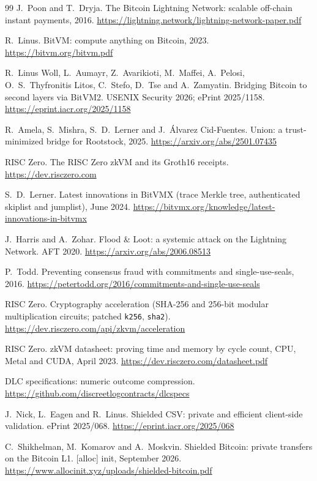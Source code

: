 \documentclass[11pt]{article}
\begin{document}
\begin{thebibliography}{99}
 J.~Poon and T.~Dryja. The Bitcoin Lightning Network: scalable off-chain instant payments, 2016. \url{https://lightning.network/lightning-network-paper.pdf}

 R.~Linus. BitVM: compute anything on Bitcoin, 2023. \url{https://bitvm.org/bitvm.pdf}

 R.~Linus Woll, L.~Aumayr, Z.~Avarikioti, M.~Maffei, A.~Pelosi, O.~S.~Thyfronitis Litos, C.~Stefo, D.~Tse and A.~Zamyatin. Bridging Bitcoin to second layers via BitVM2. USENIX Security 2026; ePrint 2025/1158. \url{https://eprint.iacr.org/2025/1158}

 R.~Amela, S.~Mishra, S.~D.~Lerner and J.~\'Alvarez Cid-Fuentes. Union: a trust-minimized bridge for Rootstock, 2025. \url{https://arxiv.org/abs/2501.07435}

 RISC Zero. The RISC Zero zkVM and its Groth16 receipts. \url{https://dev.risczero.com}

 S.~D.~Lerner. Latest innovations in BitVMX (trace Merkle tree, authenticated skiplist and jumplist), June 2024. \url{https://bitvmx.org/knowledge/latest-innovations-in-bitvmx}

 J.~Harris and A.~Zohar. Flood \& Loot: a systemic attack on the Lightning Network. AFT 2020. \url{https://arxiv.org/abs/2006.08513}

 P.~Todd. Preventing consensus fraud with commitments and single-use-seals, 2016. \url{https://petertodd.org/2016/commitments-and-single-use-seals}

 RISC Zero. Cryptography acceleration (SHA-256 and 256-bit modular multiplication circuits; patched \texttt{k256}, \texttt{sha2}). \url{https://dev.risczero.com/api/zkvm/acceleration}

 RISC Zero. zkVM datasheet: proving time and memory by cycle count, CPU, Metal and CUDA, April 2023. \url{https://dev.risczero.com/datasheet.pdf}

 DLC specifications: numeric outcome compression. \url{https://github.com/discreetlogcontracts/dlcspecs}

 J.~Nick, L.~Eagen and R.~Linus. Shielded CSV: private and efficient client-side validation. ePrint 2025/068. \url{https://eprint.iacr.org/2025/068}

 C.~Shikhelman, M.~Komarov and A.~Moskvin. Shielded Bitcoin: private transfers on the Bitcoin L1. [alloc] init, September 2026. \url{https://www.allocinit.xyz/uploads/shielded-bitcoin.pdf}

\end{thebibliography}
\end{document}
